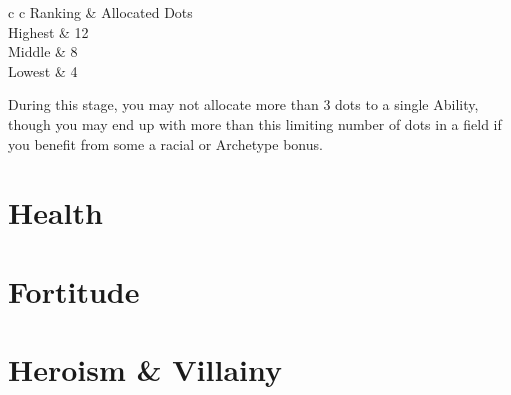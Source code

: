 \begin{center}
	\small
	\begin{rndtable}{c c}
	Ranking &  Allocated Dots \\
	Highest & 12
	\\
	Middle 	&	8
	\\
	Lowest & 4
	\end{rndtable}
\end{center}


During this stage, you may not allocate more than 3 dots to a single Ability, though you may end up with more than this limiting number of dots in a field if you benefit from some a racial or Archetype bonus. 

\section{Health}


\section{Fortitude}

\section{Heroism \& Villainy}
